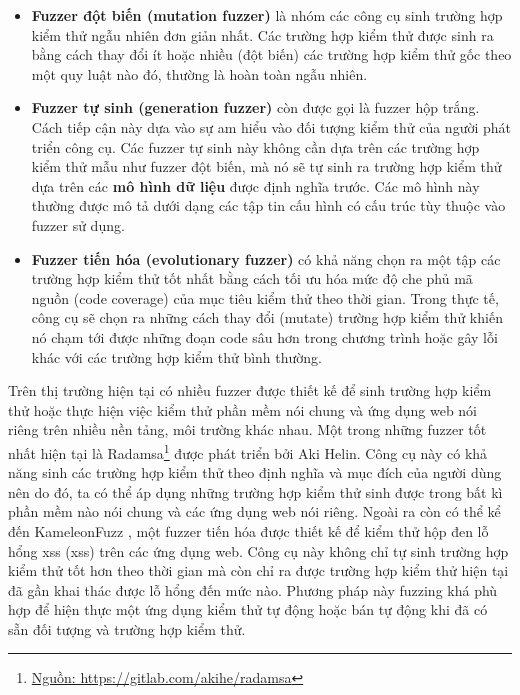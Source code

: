 \begin{itemize}
    \item \textbf{Fuzzer đột biến (mutation fuzzer)} là nhóm các công cụ sinh trường hợp kiểm thử ngẫu nhiên đơn giản nhất. Các trường hợp kiểm thử được sinh ra bằng cách thay đổi ít hoặc nhiều (đột biến) các trường hợp kiểm thử gốc theo một quy luật nào đó, thường là hoàn toàn ngẫu nhiên.
    \item \textbf{Fuzzer tự sinh (generation fuzzer)} còn được gọi là fuzzer hộp trắng. Cách tiếp cận này dựa vào sự am hiểu vào đối tượng kiểm thử của người phát triển công cụ. Các fuzzer tự sinh này không cần dựa trên các trường hợp kiểm thử mẫu như fuzzer đột biến, mà nó sẽ tự sinh ra trường hợp kiểm thử dựa trên các \textbf{mô hình dữ liệu} được định nghĩa trước. Các mô hình này thường được mô tả dưới dạng các tập tin cấu hình có cấu trúc tùy thuộc vào fuzzer sử dụng.
    \item \textbf{Fuzzer tiến hóa (evolutionary fuzzer)} có khả năng chọn ra một tập các trường hợp kiểm thử tốt nhất bằng cách tối ưu hóa mức độ che phủ mã nguồn (code coverage) của mục tiêu kiểm thử theo thời gian. Trong thực tế, công cụ sẽ chọn ra những cách thay đổi (mutate) trường hợp kiểm thử khiến nó chạm tới được những đoạn code sâu hơn trong chương trình hoặc gây lỗi khác với các trường hợp kiểm thử bình thường.
\end{itemize}
Trên thị trường hiện tại có nhiều fuzzer được thiết kế để sinh trường hợp kiểm thử hoặc thực hiện việc kiểm thử phần mềm nói chung và ứng dụng web nói riêng trên nhiều nền tảng, môi trường khác nhau. Một trong những fuzzer tốt nhất hiện tại là Radamsa\footnote{\href{https://gitlab.com/akihe/radamsa}{Nguồn: https://gitlab.com/akihe/radamsa}} được phát triển bởi Aki Helin. Công cụ này có khả năng sinh các trường hợp kiểm thử theo định nghĩa và mục đích của người dùng nên do đó, ta có thể áp dụng những trường hợp kiểm thử sinh được trong bất kì phần mềm nào nói chung và các ứng dụng web nói riêng. Ngoài ra còn có thể kể đến KameleonFuzz \parencite{KameleonFuzz}, một fuzzer tiến hóa được thiết kế để kiểm thử hộp đen lỗ hổng \acrshort{xss} (\acrlong{xss}) trên các ứng dụng web. Công cụ này không chỉ tự sinh trường hợp kiểm thử tốt hơn theo thời gian mà còn chỉ ra được trường hợp kiểm thử hiện tại đã gần khai thác được lỗ hổng đến mức nào. Phương pháp này fuzzing khá phù hợp để hiện thực một ứng dụng kiểm thử tự động hoặc bán tự động khi đã có sẵn đối tượng và trường hợp kiểm thử.
